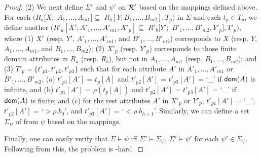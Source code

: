 \begin{proof}
\item[(2)]
We next define  $\Sigma'$ and $\psi'$ on ${\cal R'}$ based on the
mappings defined above. For each \CIND $(R_a[X;$ $A_1, \ldots,A_{m1}]
\subseteq$ $R_b[Y; B_1, \ldots, B_{m2}], T_p)$ in $\Sigma$ and each
$t_p\in T_p$, we define another \pCIND $(R'_a[X'; A'_1,\ldots,A'_{m1},X'_p] \subseteq$ $R'_b[Y';$
$B'_1,\ldots,B'_{m2},Y'_p], T'_p)$, where (1) $X'$ (resp. $Y'$,
$A'_1,\ldots,A'_{m1}$, and $B'_1,\ldots,B'_{m2}$) corresponds to $X$
(resp. $Y$, $A_1,\ldots,A_{m1}$, and $B_1,\ldots,B_{m2}$); (2) $X'_p$
(resp. $Y'_p$) corresponds to those finite domain attributes in
$R_a$ (resp. $R_b$), but not in $A_1,\ldots,A_{m1}$ (resp.
$B_1,\ldots,B_{m2}$); and (3) $T'_p = \{t'_{p1},t'_{p2},t'_{p3}\}$
such that for each attribute $A'$ in $A'_1,\ldots,A'_{m1}$ or
$B'_1,\ldots,B'_{m2}$, (a) $t'_{p1}[A']$ = $t_p[A]$ and
$t'_{p2}[A']$ = $t'_{p3}[A']$ = `\_' if $\protect\mathsf{dom}(A)$ is infinite, and
(b) $t'_{p1}[A']$ = $\rho(t_p[A])$ and $t'_{p2}[A']$ = $t'_{p3}[A']$
= `\_' if $\protect\mathsf{dom}(A)$ is finite; and (c) for the rest attributes $A'$
in $X'_p$ or $Y'_p$, $t'_{p1}[A']$ = `\_', $t'_{p2}[A']$ =
`$>\rho.b_0$', and $t'_{p3}[A']$ = `$<\rho.b_{h+1}$'. Similarly, we
can define a set $\Sigma_{\psi}$ of \pCINDs from $\psi$ based on the
mappings.
\ei

Finally, one can easily verify that $\Sigma\models\psi$ iff
$\Sigma'\models\Sigma_{\psi}$, \ie $\Sigma'\models\psi'$ for each
\pCIND $\psi'\in\Sigma_{\psi}$. Following from this, the problem is
\EXPTIME-hard.
\end{proof}

